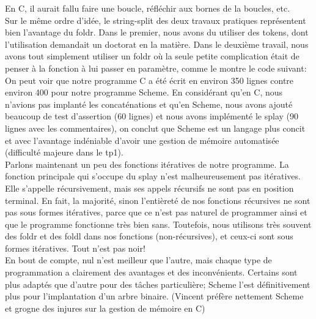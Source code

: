\documentclass[french]{article}
\begin{document}
				
				
				
				
				En C, il aurait fallu faire une boucle, réfléchir aux bornes 
				de la boucles, etc.
				\\
				
				Sur le même ordre d'idée, le string-split des deux travaux 
				pratiques représentent bien l'avantage du foldr. Dans le 
				premier, nous avons du utiliser des tokens, dont l'utilisation 
				demandait un doctorat en la matière. Dans le deuxième travail, 
				nous avons tout simplement utiliser un foldr où la seule 
				petite complication était de penser à la fonction à lui passer 
				en paramètre, comme le montre le code suivant:
				\\
				
				
				
				
				
				
				On peut voir que notre programme C a été écrit en environ 350 
				lignes contre environ 400 pour notre programme Scheme. En 
				considérant qu'en C, nous n'avions pas implanté les 
				concaténations et qu'en Scheme, nous avons ajouté beaucoup de 
				test d'assertion (60 lignes) et nous avons implémenté le splay 
				(90 lignes avec les commentaires), on conclut que Scheme est 
				un langage plus concit et avec l'avantage indéniable d'avoir 
				une gestion de mémoire automatisée (difficulté majeure dans le 
				tp1).\\
				
				Parlons maintenant un peu des fonctions itératives de notre 
				programme. La fonction principale qui s'occupe du splay n'est 
				malheureusement pas itératives. Elle s'appelle récursivement, 
				mais ses appels récursifs ne sont pas en position terminal. En 
				fait, la majorité, sinon l'entièreté de nos fonctions 
				récursives ne sont pas sous formes itératives, parce que ce 
				n'est pas naturel de programmer ainsi et que le programme 
				fonctionne très 
				bien sans. Toutefois, nous utilisons très 
				souvent des foldr et des foldl dans nos fonctions 
				(non-récursives), et ceux-ci sont sous formes itératives. Tout 
				n'est pas noir!\\
				
				En bout de compte, nul n'est meilleur que l'autre, mais chaque 
				type de programmation a clairement des avantages et des 
				inconvénients. Certains sont plus adaptés que d'autre pour des 
				tâches particulière; Scheme l'est définitivement plus pour 
				l'implantation d'un arbre binaire. (Vincent préfère nettement 
				Scheme et grogne des injures sur la gestion de mémoire en C)
		
		
	
\end{document}
